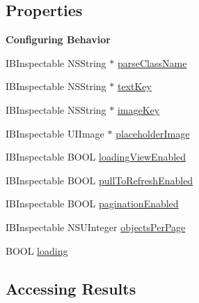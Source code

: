 \subsection*{Properties}
\begin{Indent}{\bf Configuring Behavior}\par
{\em 

 

 }\begin{DoxyCompactItemize}
\item 
I\+B\+Inspectable N\+S\+String $\ast$ \hyperlink{interface_p_f_query_table_view_controller_aaae6bcb41e59355b0bbf91a524bfc714}{parse\+Class\+Name}
\item 
I\+B\+Inspectable N\+S\+String $\ast$ \hyperlink{interface_p_f_query_table_view_controller_a8c8efe19f3ac20c048c82af0278d82b5}{text\+Key}
\item 
I\+B\+Inspectable N\+S\+String $\ast$ \hyperlink{interface_p_f_query_table_view_controller_aa146ef8616090c43f7bea9364728713d}{image\+Key}
\item 
I\+B\+Inspectable U\+I\+Image $\ast$ \hyperlink{interface_p_f_query_table_view_controller_a6e435ec43463857e02845f37174a342b}{placeholder\+Image}
\item 
I\+B\+Inspectable B\+O\+O\+L \hyperlink{interface_p_f_query_table_view_controller_a148dfb629f55cd4e20b0ac3936f365c9}{loading\+View\+Enabled}
\item 
I\+B\+Inspectable B\+O\+O\+L \hyperlink{interface_p_f_query_table_view_controller_ac6eea74d27530d3cc9e9b1b4ac5515ba}{pull\+To\+Refresh\+Enabled}
\item 
I\+B\+Inspectable B\+O\+O\+L \hyperlink{interface_p_f_query_table_view_controller_aafceccf00447e9f7e1d8db2faf4e8c76}{pagination\+Enabled}
\item 
I\+B\+Inspectable N\+S\+U\+Integer \hyperlink{interface_p_f_query_table_view_controller_a7d06a88ac58846f32e9ad109540f1297}{objects\+Per\+Page}
\item 
B\+O\+O\+L \hyperlink{interface_p_f_query_table_view_controller_a2578f4fcefdba208a25fe508e09e31a3}{loading}
\end{DoxyCompactItemize}
\end{Indent}
\subsection*{Accessing Results}
\label{_amgrp09728c99dc72fa61614ba2e2c37af37c}%


 

